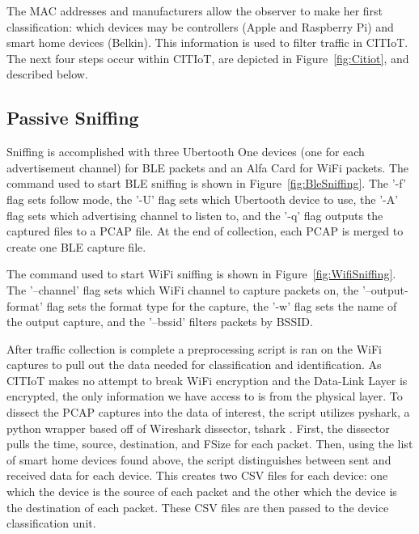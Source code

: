 \figReconScanning
\figOui

The MAC addresses and manufacturers allow the observer to make her first classification: which devices may be controllers (Apple and Raspberry Pi) and smart home devices (Belkin). This information is used to filter traffic in CITIoT. The next four steps occur within CITIoT, are depicted in Figure~\ref{fig:Citiot}, and described below.

\figCitiot

\subsection{Passive Sniffing}

Sniffing is accomplished with three Ubertooth One devices (one for each advertisement channel) for \ac{BLE} packets and an Alfa Card for WiFi packets. The command used to start \ac{BLE} sniffing is shown in Figure~\ref{fig:BleSniffing}. The '-f' flag sets follow mode, the '-U' flag sets which Ubertooth device to use, the '-A' flag sets which advertising channel to listen to, and the '-q' flag outputs the captured files to a PCAP file. At the end of collection, each PCAP is merged to create one \ac{BLE} capture file.

\figBleSniffing

The command used to start WiFi sniffing is shown in Figure~\ref{fig:WifiSniffing}. The '--channel' flag sets which WiFi channel to capture packets on, the '--output-format' flag sets the format type for the capture, the '-w' flag sets the name of the output capture, and the '--bssid' filters packets by \ac{BSSID}.

\figWifiSniffing

After traffic collection is complete a preprocessing script is ran on the WiFi captures to pull out the data needed for classification and identification. As CITIoT makes no attempt to break WiFi encryption and the Data-Link Layer is encrypted, the only information we have access to is from the physical layer. To dissect the PCAP captures into the data of interest, the script utilizes pyshark, a python wrapper based off of Wireshark dissector, tshark \cite{pyshark}. First, the dissector pulls the time, source, destination, and \ac{FSize} for each packet. Then, using the list of smart home devices found above, the script distinguishes between sent and received data for each device. This creates two \ac{CSV} files for each device: one which the device is the source of each packet and the other which the device is the destination of each packet. These \ac{CSV} files are then passed to the device classification unit.

